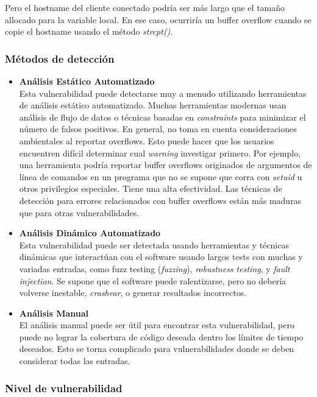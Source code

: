 Pero el hostname del cliente conectado podría ser más largo que el tamaño allocado para la variable local. En ese caso, ocurriría un buffer overflow cuando se copie
el hostname usando el método \textit{strcpt()}.

\subsubsection{Métodos de detección}

\begin{itemize}
    \item \textbf{Análisis Estático Automatizado}\\
        Esta vulnerabilidad puede detectarse muy a menudo utilizando herramientas de análisis estático automatizado. Muchas herramientas modernas usan análisis de flujo de datos
        o técnicas basadas en \textit{constraints} para minimizar el número de falsos positivos. En general, no toma en cuenta consideraciones ambientales al reportar overflows. Esto puede
        hacer que los usuarios encuentren difícil determinar cual \textit{warning} investigar primero. Por ejemplo, una herramienta podría reportar buffer overflows originados de argumentos
        de línea de comandos en un programa que no se supone que corra con \textit{setuid} u otros privilegios especiales.
        Tiene una alta efectividad. Las técnicas de detección para errores relacionados con buffer overflows están más maduras que para otras vulnerabilidades.
    \item \textbf{Análisis Dinámico Automatizado}\\
        Esta vulnerabilidad puede ser detectada usando herramientas y técnicas dinámicas que interactúan con el software usando largos tests con muchas y variadas entradas, como
        fuzz testing (\textit{fuzzing}), \textit{robustness testing}, y \textit{fault injection}. Se supone que el software puede ralentizarse, pero no debería volverse inestable,
        \textit{crashear}, o generar resultados incorrectos.
    \item \textbf{Análisis Manual}\\
        El análisis manual puede ser útil para encontrar esta vulnerabilidad, pero puede no lograr la cobertura de código deseada dentro los límites de tiempo deseados. Esto se torna
        complicado para vulnerabilidades donde se deben considerar todas las entradas.
\end{itemize}

\subsubsection{Nivel de vulnerabilidad}

